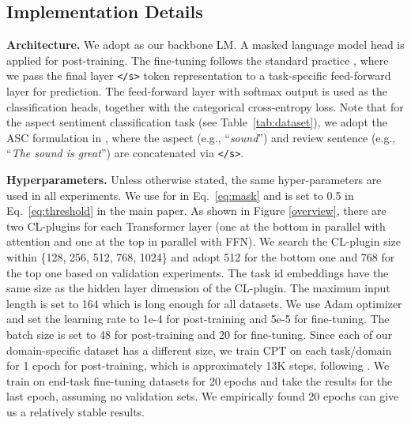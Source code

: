 \documentclass[11pt]{article}
\begin{document}
{\color{black}\subsection{Implementation Details} \textbf{Architecture.} We adopt  as our backbone LM. A masked language model head is applied for post-training. The fine-tuning follows the standard practice \cite{DBLP:conf/naacl/DevlinCLT19}, where we pass the final layer \texttt{</s>} token representation to a task-specific feed-forward layer for prediction. The feed-forward layer with softmax output is used as the classification heads, together with the categorical cross-entropy loss. Note that for the aspect sentiment classification task (see Table~\ref{tab:dataset}), we adopt the ASC formulation in \cite{DBLP:conf/naacl/XuLSY19}, where the aspect (e.g., ``\textit{sound}'') and review sentence (e.g., ``\textit{The sound is great}'') are concatenated via \texttt{</s>}. 

\textbf{Hyperparameters.}
Unless otherwise stated, the same hyper-parameters are used in all experiments.  We use  for  in Eq.~\ref{eq:mask} and  is set to 0.5 in Eq.~\ref{eq:threshold} in the main paper. 
As shown in Figure \ref{overview}, there are two CL-plugins for each Transformer layer (one at the bottom in parallel with attention and one at the top in parallel with FFN). We search the CL-plugin size within \{128, 256, 512, 768, 1024\} and adopt 512 for the bottom one and 768 for the top one based on validation experiments. The task id embeddings have the same size as the hidden layer dimension of the CL-plugin.
The maximum input length is set to 164 which is long enough for all datasets. We use Adam optimizer and set the learning rate to 1e-4 for post-training and 5e-5 for fine-tuning. The batch size is set to 48 for post-training and 20 for fine-tuning. Since each of our domain-specific dataset has a different size, we train CPT on each task/domain for 1 epoch for post-training, which is approximately 13K steps, following \cite{DBLP:conf/acl/GururanganMSLBD20,DBLP:conf/naacl/XuLSY19}. We train on end-task fine-tuning datasets for 20 epochs and take the results for the last epoch, assuming no validation sets. We empirically found 20 epochs can give us a relatively stable results.} 
\end{document}
